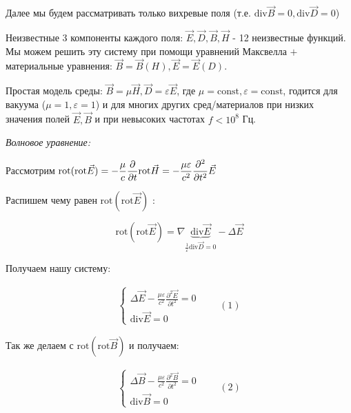 \documentclass[12pt, a4paper]{report}
\begin{document}
Далее мы будем рассматривать только вихревые поля (т.е. \( \mathrm{div} \vec{B} = 0 ,\mathrm{div} \vec{D} = 0  \))

Неизвестные 3 компоненты каждого поля: \( \vec{E},\vec{D},\vec{B},\vec{H}\) - 12 неизвестные функций. Мы можем решить эту систему при помощи уравнений Максвелла \( + \)  материальные уравнения: \( \vec{B}=\vec{B}(H), \vec{E}=\vec{E}(D) \).

Простая модель среды: \( \vec{B}=\mu\vec{H}, \vec{D}=\varepsilon \vec{E} \), где \( \mu = \mathrm{const}  , \varepsilon =\mathrm{const}   \), годится для вакуума (\(\mu=1, \varepsilon=1  \)) и для многих других сред/материалов при низких значения полей \( \vec{E}, \vec{B} \)  и при невысоких частотах \( f < 10^8 \) Гц. 
 
\newpage

\textit{Волновое уравнение:} 

Рассмотрим \(  \displaystyle  \mathrm{rot} (\mathrm{rot} \vec{E}  )= -\frac{\mu}{c}  \frac{\partial}{\partial t} \mathrm{rot } \vec{H}= - \frac{\mu \varepsilon}{ c ^2} \frac{\partial ^2}{\partial t ^2}     \vec{E} \\ \) 

Распишем чему равен \( \mathrm{rot}(\mathrm{rot}\vec{E}  )   \) :

\[         \displaystyle \mathrm{rot} (\mathrm{rot} \vec{E}  )= \nabla \underbrace{\mathrm{div} \vec{E}}_{\frac{1}{\varepsilon} \mathrm{div}\vec{D}=0   }    - \Delta \vec{E}   \] 

Получаем нашу систему:

\[
\begin{aligned}
    \begin{cases}
        \displaystyle \Delta \vec{E}- \frac{\mu \varepsilon}{c ^2} \frac{\partial ^2 \vec{E}}{\partial t ^2} =0 \\
        \displaystyle \mathrm{div}   \vec{E}=0 
    \end{cases} 
    \quad \quad  (1)
\end{aligned} 
\] 

Так же делаем с \( \mathrm{rot }(\mathrm{rot}\vec{B})\) и получаем: 

\[
\begin{aligned}
    \begin{cases}
        \displaystyle  \Delta \vec{B} - \frac{\mu \varepsilon}{c ^2} \frac{\partial ^2 \vec{B}}{\partial t ^2} =0 \\
        \displaystyle \mathrm{div}   \vec{B}=0
    \end{cases}
    \quad \quad  (2)
\end{aligned} 
\]
\end{document}
